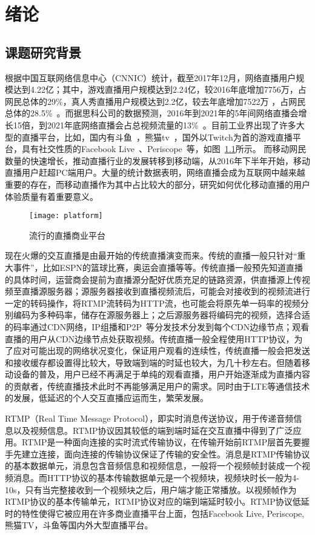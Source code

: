 \chapter{绪论}
\label{cha:intro}

\section{课题研究背景}
根据中国互联网络信息中心（CNNIC）统计，截至2017年12月，网络直播用户规模达到4.22亿；其中，游戏直播用户规模达到2.24亿，较2016年底增加7756万，占网民总体的29\%，真人秀直播用户规模达到2.2亿，较去年底增加7522万
，占网民总体的28.5\%~\cite{CNNIC}。而据思科公司的数据预测，2016年到2021年的5年间网络直播会增长15倍，到2021年底网络直播会占总视频流量的13\%~\cite{Cisco2017}。目前工业界出现了许多大型的直播平台，比如，国内有斗鱼~\cite{Douyu}，熊猫tv~\cite{Panda}，国外以Twitch为首的游戏直播平台，具有社交性质的Facebook Live~\cite{Facebook}、Periscope~\cite{Periscope}等，如图~\ref{fig:platform}所示。 而移动网民数量的快速增长，推动直播行业的发展转移到移动端，从2016年下半年开始，移动直播用户赶超PC端用户。大量的统计数据表明，网络直播会成为互联网中越来越重要的存在，而移动直播作为其中占比较大的部分，研究如何优化移动直播的用户体验质量有着重要意义。

\begin{figure}[t]%
  \centering
  \texttt{[image: platform]}
  \caption{流行的直播商业平台}
  \label{fig:platform}
\end{figure}

现在火爆的交互直播是由最开始的传统直播演变而来。传统的直播一般只针对“重大事件”，比如ESPN的篮球比赛，奥运会直播等等。传统直播一般预先知道直播的具体时间，运营商会提前为直播源分配好优质充足的链路资源，供直播源上传视频至直播源服务器；源服务器接收到直播视频流后，可能会对接收到的视频流进行一定的转码操作，将RTMP流转码为HTTP流，也可能会将原先单一码率的视频分别编码为多种码率，储存在源服务器上；之后源服务器将编码完的视频，选择合适的码率通过CDN网络，IP组播和P2P~\cite{zhang2005coolstreaming}等分发技术分发到每个CDN边缘节点；观看直播的用户从CDN边缘节点处获取视频。传统直播一般全程使用HTTP协议，为了应对可能出现的网络状况变化，保证用户观看的连续性，传统直播一般会把发送和接收缓存都设置得比较大，导致端到端的时延也较大，为几十秒左右。但随着移动设备的普及，用户已经不再满足于单纯的观看直播，用户开始逐渐成为直播内容的贡献者，传统直播技术此时不再能够满足用户的需求。同时由于LTE等通信技术的发展，低延迟的个人交互直播应运而生，繁荣发展。

RTMP（Real Time Message Protocol），即实时消息传送协议，用于传递音频信息以及视频信息。RTMP协议因其较低的端到端时延在交互直播中得到了广泛应用。RTMP是一种面向连接的实时流式传输协议，在传输开始前RTMP层首先要握手先建立连接，面向连接的传输协议保证了传输的安全性。消息是RTMP传输协议的基本数据单元，消息包含音频信息和视频信息，一般将一个视频帧封装成一个视频消息。而HTTP协议的基本传输数据单元是一个视频块，视频块时长一般为4-10s，只有当完整接收到一个视频块之后，用户端才能正常播放。以视频帧作为RTMP协议的基本传输单元，RTMP协议对应的端到端延时较小。RTMP协议低延时的特性使得它被应用在许多商业直播平台上面，包括Facebook Live, Periscope,熊猫TV，斗鱼等国内外大型直播平台。

